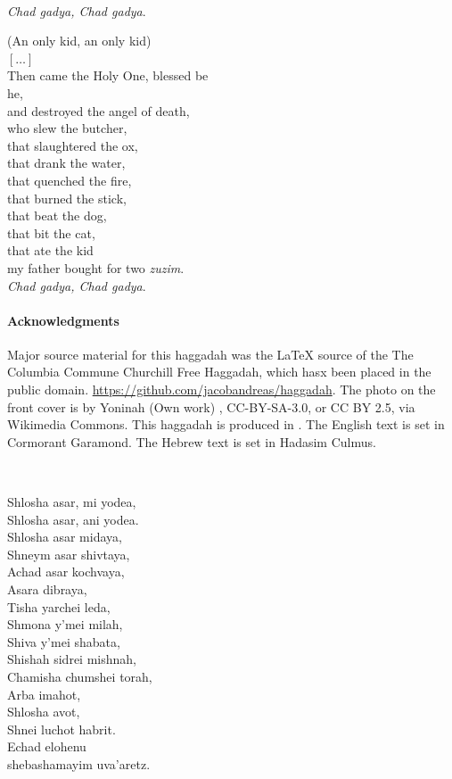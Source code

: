 \documentclass[extrafontsizes,twoside,17pt,a4paper,openany]{memoir}
\newcommand{\HgEllipsis}{\ensuremath{\left[\ldots\right]}}
\newcommand{\cH}{Ch}
\newenvironment{HgEnglish}{\strut\\\noindent}{\vspace{1em}}
\newenvironment{HgTranslit}{\strut\\\noindent\begin{itshape}}{\end{itshape}\vspace{1em}}
\begin{document}
\begin{multicols}{2}\raggedright
\begin{HgEnglish}
{\itshape {\cH}ad gadya, {\cH}ad gadya}. \\
\strut \hfill (An only kid, an only kid) \\
\HgEllipsis \\
Then came the Holy One, blessed be \\
\vin he, \\
and destroyed the angel of death, \\
who slew the butcher, \\
that slaughtered the ox, \\
that drank the water, \\
that quenched the fire, \\
that burned the stick, \\
that beat the dog, \\
that bit the cat, \\
that ate the kid \\
my father bought for two {\itshape zuzim}. \\
{\itshape {\cH}ad gadya, {\cH}ad gadya}.
\end{HgEnglish}

{\tiny
\paragraph*{Acknowledgments}

\raggedright
Major  source material for this haggadah was the {\LaTeX}
source of the The Columbia Commune Churchill Free Haggadah, which hasx been
  placed in the public domain.
   \url{https://github.com/jacobandreas/haggadah}.
The photo on the
  front cover is by Yoninah (Own work) , CC-BY-SA-3.0, 
  or CC BY 2.5, via Wikimedia
  Commons. This  haggadah is produced in {\XeLaTeX}. The English text is
set in Cormorant Garamond. The Hebrew text is set in Hadasim Culmus.
}

\columnbreak
\begin{HgTranslit}
Shlosha asar, mi yodea, \\
Shlosha asar, ani yodea.\\
Shlosha asar midaya, \\
Shneym asar shivtaya, \\
Achad asar kochvaya, \\
Asara dibraya, \\
Tisha yarchei leda, \\
Shmona y’mei milah,\\
Shiva y’mei shabata, \\
Shishah sidrei mishnah,\\ 
Chamisha chumshei torah,\\ 
Arba imahot,\\ 
Shlosha avot,\\
Shnei luchot habrit. \\
Echad elohenu \\
shebashamayim uva’aretz.
\end{HgTranslit}


\end{multicols}
\end{document}
